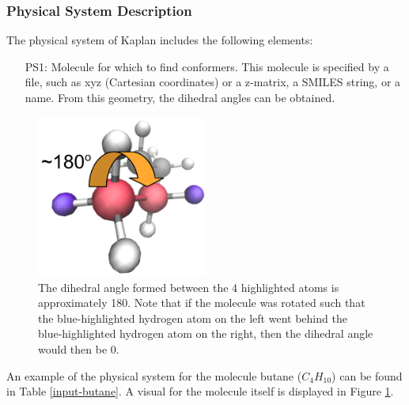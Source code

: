 \documentclass[12pt]{article}
\newcommand{\progname}{Kaplan} %
\begin{document}
\subsubsection{Physical System Description}

The physical system of \progname{} includes the following elements:

\begin{itemize}

\item[PS1:] Molecule for which to find conformers. This molecule is specified 
by a file, such as xyz (Cartesian coordinates) or a 
z-matrix, a SMILES string, 
or a name. From this geometry, the dihedral angles can be obtained.

\end{itemize}

\begin{figure}[H]
	\begin{center}
	\includegraphics[width=0.5\textwidth]{butane-dihedral}
	\end{center}
	\caption{The dihedral angle formed between the 4 highlighted atoms is 
	approximately 180\textdegree. Note that if the molecule was rotated such 
	that the blue-highlighted hydrogen atom on the left went behind the 
	blue-highlighted hydrogen atom on the right, then the dihedral angle would 
	then be 0\textdegree.}
	\label{butane-dihedral}
\end{figure}

An example of the physical system for the molecule butane ($C_4H_{10}$) can be 
found in Table \ref{input-butane}. A visual for the molecule itself is 
displayed in Figure \ref{butane-dihedral}.
\end{document}
